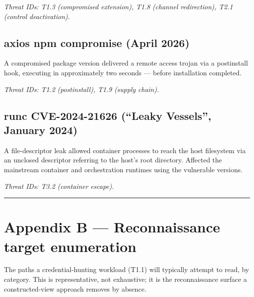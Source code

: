 \emph{Threat IDs: T1.3 (compromised extension), T1.8 (channel
redirection), T2.1 (control deactivation).}

\hypertarget{axios-npm-compromise-april-2026}{%
\section{axios npm compromise (April
2026)}\label{axios-npm-compromise-april-2026}}

A compromised package version delivered a remote access trojan via a
postinstall hook, executing in approximately two seconds --- before
installation completed.

\emph{Threat IDs: T1.2 (postinstall), T1.9 (supply chain).}

\hypertarget{runc-cve-2024-21626-leaky-vessels-january-2024}{%
\section{runc CVE-2024-21626 (``Leaky Vessels'', January
2024)}\label{runc-cve-2024-21626-leaky-vessels-january-2024}}

A file-descriptor leak allowed container processes to reach the host
filesystem via an unclosed descriptor referring to the host's root
directory. Affected the mainstream container and orchestration runtimes
using the vulnerable versions.

\emph{Threat IDs: T3.2 (container escape).}

\begin{center}\rule{0.5\linewidth}{0.5pt}\end{center}

\hypertarget{appendix-b-reconnaissance-target-enumeration}{%
\chapter{Appendix B --- Reconnaissance target
enumeration}\label{appendix-b-reconnaissance-target-enumeration}}

The paths a credential-hunting workload (T1.1) will typically attempt to
read, by category. This is representative, not exhaustive; it is the
reconnaissance surface a constructed-view approach removes by absence.

